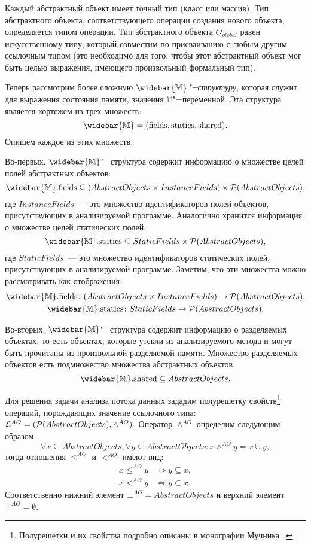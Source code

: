 \documentclass[14pt,titlepage,draft]{extarticle}
\newcommand{\M}{\ensuremath{\mathbb{M}}}
\newcommand{\Ms}{\ensuremath{\mathbb{\widebar{M}}}}
\newcommand{\Mfield}[1]{\ensuremath{\mathrm{#1}}}
\newcommand{\AO}[1]{O_{#1}}
\newcommand{\AOGlobal}{\AO{global}}
\newcommand{\Lattice}{\mathcal{L}}
\newcommand{\meet}{\wedge}
\begin{document}
    Каждый абстрактный объект имеет точный тип (класс или массив). Тип
    абстрактного объекта, соответствующего операции создания нового объекта,
    определяется типом операции. Тип абстрактного объекта $\AOGlobal$ равен
    искусственному типу, который совместим по присваиванию с любым другим
    ссылочным типом (это необходимо для того, чтобы этот абстрактный объект мог
    быть целью выражения, имеющего произвольный формальный тип).

    Теперь рассмотрим более сложную \emph{\Ms"=структуру}, которая служит для
    выражения состояния памяти, значения \M"=переменной.
    Эта структура является кортежем из трех множеств:
    \[ \Ms = (\Mfield{fields}, \Mfield{statics}, \Mfield{shared}). \]
    Опишем каждое из этих множеств.

    Во-первых, \Ms"=структура содержит информацию о множестве целей полей
    абстрактных объектов:
    \[
      \Ms.\Mfield{fields} \subseteq
        (AbstractObjects \times InstanceFields) \times
        \powerset{AbstractObjects},
    \]
    где $InstanceFields$~--- это множество идентификаторов полей объектов,
    присутствующих в анализируемой программе.
    Аналогично хранится информация о множестве целей статических полей:
    \[
      \Ms.\Mfield{statics} \subseteq
        StaticFields \times \powerset{AbstractObjects},
    \]
    где $StaticFields$~--- это множество идентификаторов статических полей,
    присутствующих в анализируемой программе.
    Заметим, что эти множества можно рассматривать как
    отображения:
    \begin{gather*}
      \Ms.\Mfield{fields} \colon
        (AbstractObjects \times InstanceFields) \to
        \powerset{AbstractObjects}, \\
      \Ms.\Mfield{statics} \colon
        StaticFields \to \powerset{AbstractObjects}.
    \end{gather*}

    Во-вторых, \Ms"=структура содержит информацию о разделяемых объектах,
    то есть объектах, которые утекли  из анализируемого метода
    и могут быть прочитаны из произвольной разделяемой памяти. Множество
    разделяемых объектов есть подмножество множества абстрактных объектов:
    \[ \Ms.\Mfield{shared} \subseteq AbstractObjects. \]

    Для решения задачи анализа потока данных зададим полурешетку
    свойств\footnote{
      Полурешетки и их свойства подробно описаны в монографии
      Мучника~\cite{muchnick}.
    }
    операций, порождающих значение ссылочного типа:
    $\Lattice^{AO} = (\powerset{AbstractObjects}, \meet^{AO})$.
    Оператор $\meet^{AO}$ определим следующим образом
    \[
      \forall x \subseteq AbstractObjects, \forall y \subseteq AbstractObjects
      \colon
      x \meet^{AO} y = x \cup y,
    \]
    тогда отношения $\leq^{AO}$ и $<^{AO}$ имеют вид:
    \begin{align*}
      x \leq^{AO} y &\Leftrightarrow y \subseteq x, \\
      x <^{AO} y &\Leftrightarrow y \subset x.
    \end{align*}
    Соответственно нижний элемент $\bot^{AO} = AbstractObjects$
    и верхний элемент $\top^{AO} = \emptyset$.
\end{document}
